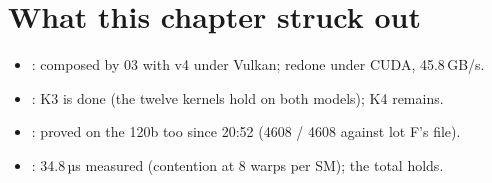 \section{What this chapter struck out}\label{sec:t2n-barres}

\begin{itemize}
\item {}: composed by 03 with v4 under Vulkan; redone under CUDA, 45.8\,GB/s.
\item {}: K3 is done (the twelve kernels hold on both models); K4 remains.
\item {}: proved on the 120b too since 20:52 (\num{4608} / \num{4608} against lot F's file).
\item {}: 34.8\,µs measured (contention at 8 warps per SM); the total holds.
\end{itemize}

